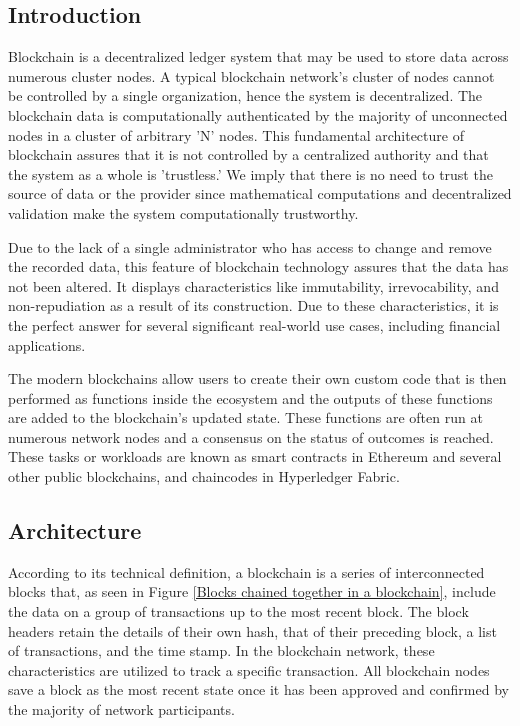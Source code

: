 \subsection{Introduction}
Blockchain is a decentralized ledger system that may be used to store data across numerous cluster nodes. A typical blockchain network's cluster of nodes cannot be controlled by a single organization, hence the system is decentralized. The blockchain data is computationally authenticated by the majority of unconnected nodes in a cluster of arbitrary 'N' nodes. This fundamental architecture of blockchain assures that it is not controlled by a centralized authority and that the system as a whole is 'trustless.' We imply that there is no need to trust the source of data or the provider since mathematical computations and decentralized validation make the system computationally trustworthy.

\vspace{.5cm}

Due to the lack of a single administrator who has access to change and remove the recorded data, this feature of blockchain technology assures that the data has not been altered. It displays characteristics like immutability, irrevocability, and non-repudiation as a result of its construction. Due to these characteristics, it is the perfect answer for several significant real-world use cases, including financial applications.

\vspace{.5cm}

The modern blockchains allow users to create their own custom code that is then performed as functions inside the ecosystem and the outputs of these functions are added to the blockchain's updated state. These functions are often run at numerous network nodes and a consensus on the status of outcomes is reached. These tasks or workloads are known as smart contracts in Ethereum and several other public blockchains, and chaincodes in Hyperledger Fabric.


\subsection{Architecture}
According to its technical definition, a blockchain is a series of interconnected blocks that, as seen in Figure \ref{Blocks chained together in a blockchain}, include the data on a group of transactions up to the most recent block. The block headers retain the details of their own hash, that of their preceding block, a list of transactions, and the time stamp. In the blockchain network, these characteristics are utilized to track a specific transaction. All blockchain nodes save a block as the most recent state once it has been approved and confirmed by the majority of network participants.

